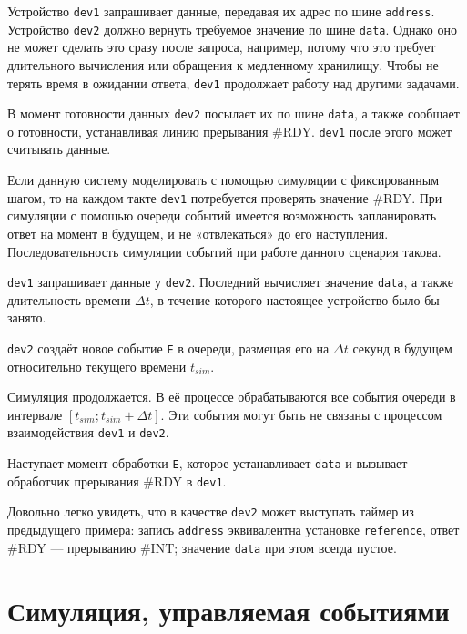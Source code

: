 Устройство \texttt{dev1} запрашивает данные, передавая их адрес по шине \texttt{address}. Устройство \texttt{dev2} должно вернуть требуемое значение по шине \texttt{data}. Однако оно не может сделать это сразу после запроса, например, потому что это требует длительного вычисления или обращения к медленному хранилищу. Чтобы не терять время в ожидании ответа, \texttt{dev1} продолжает работу над другими задачами.

В момент готовности данных \texttt{dev2} посылает их по шине \texttt{data}, а также сообщает о готовности, устанавливая линию прерывания \#RDY. \texttt{dev1} после этого может считывать данные.

Если данную систему моделировать с помощью симуляции с фиксированным шагом, то на каждом такте \texttt{dev1} потребуется проверять значение \#RDY. При симуляции с помощью очереди событий имеется возможность запланировать ответ на момент в будущем, и не «отвлекаться» до его наступления. Последовательность симуляции событий при работе данного сценария такова.
\begin{enumerate*}
    \item \texttt{dev1} запрашивает данные у \texttt{dev2}. Последний вычисляет значение \texttt{data}, а также длительность времени $\Delta t$, в течение которого настоящее устройство было бы занято.
    \item \texttt{dev2} создаёт новое событие \texttt{E} в очереди, размещая его на $\Delta t$ секунд в будущем относительно текущего времени $t_{sim}$.
    \item Симуляция продолжается. В её процессе обрабатываются все события очереди в интервале $[t_{sim}; t_{sim} + \Delta t]$. Эти события могут быть не связаны с процессом взаимодействия \texttt{dev1} и \texttt{dev2}.
    \item Наступает момент обработки \texttt{E}, которое устанавливает \texttt{data} и вызывает обработчик прерывания \#RDY в \texttt{dev1}.
\end{enumerate*}

Довольно легко увидеть, что в качестве \texttt{dev2} может выступать таймер из предыдущего примера: запись \texttt{address} эквивалентна установке \texttt{reference}, ответ \#RDY — прерыванию \#INT; значение \texttt{data} при этом всегда пустое.

\section{Симуляция, управляемая событиями}

